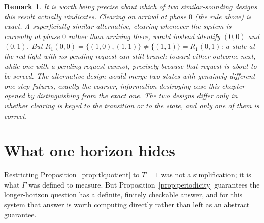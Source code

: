 \documentclass[11pt]{report}
\newtheorem{remark}{Remark}[chapter]
\begin{document}
\begin{remark}
It is worth being precise about which of two similar-sounding designs
this result actually vindicates. Clearing on arrival at phase $0$
(the rule above) is exact. A superficially similar alternative,
clearing whenever the system is currently \emph{at} phase $0$ rather
than arriving there, would instead identify $(0,0)$ and $(0,1)$. But
$R_1(0,0) = \{(1,0),(1,1)\} \neq \{(1,1)\} = R_1(0,1)$: a state at the
red light with no pending request can still branch toward either
outcome next, while one with a pending request cannot, precisely
because that request is about to be served. The alternative design
would merge two states with genuinely different one-step futures,
exactly the coarser, information-destroying case this chapter opened
by distinguishing from the exact one. The two designs differ only in
whether clearing is keyed to the transition or to the state, and only
one of them is correct.
\end{remark}

\section*{What one horizon hides}

Restricting Proposition~\ref{prop:tlquotient} to $T=1$ was not a
simplification; it is what $\Gamma$ was defined to measure. But
Proposition~\ref{prop:periodicity} guarantees the longer-horizon
question has a definite, finitely checkable answer, and for this
system that answer is worth computing directly rather than left as an
abstract guarantee.
\end{document}
